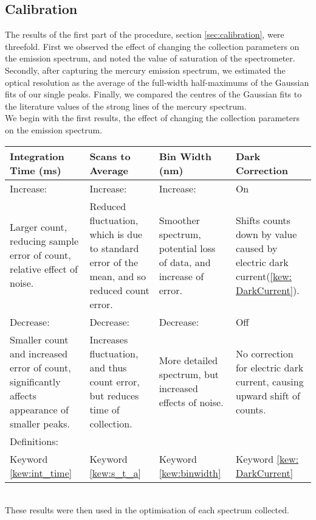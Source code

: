 \documentclass{article}
\begin{document}
\subsection{Calibration}
The results of the first part of the procedure, section \ref{sec:calibration}, were threefold. First we observed the effect of changing the collection parameters on the emission spectrum, and noted the value of saturation of the spectrometer. Secondly, after capturing the mercury emission spectrum, we estimated the optical resolution as the average of the full-width half-maximums of the Gaussian fits of our single peaks. Finally, we compared the centres of the Gaussian fits to the literature values of the strong lines of the mercury spectrum.\\
\indent We begin with the first results, the effect of changing the collection parameters on the emission spectrum.\\
\begin{tabular}{p{}p{}p{}p{}}
    \hline
    \hline
    Integration Time (ms) & Scans to Average & Bin Width (nm) & Dark Correction\\
    \hline
    Increase: & Increase: & Increase: & On\\
    Larger count, reducing sample error of count, relative effect of noise. & Reduced fluctuation, which is due to standard error of the mean, and so reduced count error. &  Smoother spectrum, potential loss of data, and increase of error. & Shifts counts down by value caused by electric dark current(\ref{kew: DarkCurrent}).\\
    \hline
    Decrease: & Decrease: & Decrease: & Off\\
    Smaller count and increased error of count, significantly affects appearance of smaller peaks. & Increases fluctuation, and thus count error, but reduces time of collection. & More detailed spectrum, but increased effects of noise. & No correction for electric dark current, causing upward shift of counts.\\
    \hline
    Definitions: &~&~&~\\
    Keyword \ref{kew:int_time}& Keyword \ref{kew:s_t_a}& Keyword \ref{kew:binwidth}& Keyword \ref{kew: DarkCurrent}\\
    \hline
    \hline
\end{tabular}
\vspace{1cm}\\
These results were then used in the optimisation of each spectrum collected.\\
\end{document}
